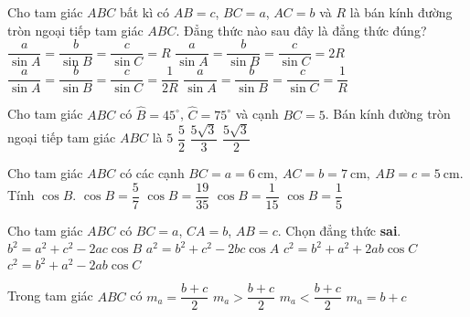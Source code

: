 \begin{ex}
	Cho tam giác $ABC$ bất kì có $AB=c$, $BC=a$, $AC=b$ và $R$ là bán kính đường tròn ngoại tiếp tam giác $ABC$. Đẳng thức nào sau đây là đẳng thức đúng?
	\choice
	{$\dfrac{a}{\sin A}=\dfrac{b}{\sin B}=\dfrac{c}{\sin C}=R$}
	{\True $\dfrac{a}{\sin A}=\dfrac{b}{\sin B}=\dfrac{c}{\sin C}=2R$}
	{$\dfrac{a}{\sin A}=\dfrac{b}{\sin B}=\dfrac{c}{\sin C}=\dfrac{1}{2R}$}
	{$\dfrac{a}{\sin A}=\dfrac{b}{\sin B}=\dfrac{c}{\sin C}=\dfrac{1}{R}$}
\end{ex}
\begin{ex}
	Cho tam giác $ABC$ có $\widehat{B}=45^\circ$, $\widehat{C}=75^\circ$ và cạnh $BC=5$. Bán kính đường tròn ngoại tiếp tam giác $ABC$ là
	\choice
	{$5$}
	{$\dfrac{5}{2}$}
	{\True $\dfrac{5 \sqrt{3}}{3}$}
	{$\dfrac{5 \sqrt{3}}{2}$}
\end{ex}
\begin{ex}
	Cho tam giác $ABC$ có các cạnh $BC=a=6\ \mathrm{cm},\ AC=b=7\ \mathrm{cm},\ AB=c=5\ \mathrm{cm}$. Tính $\cos B$.
	\choice
	{$\cos B=\dfrac{5}{7}$}
	{$\cos B=\dfrac{19}{35}$}
	{$\cos B=\dfrac{1}{15}$}
	{\True $\cos B=\dfrac{1}{5}$}
\end{ex}
\begin{ex}
	Cho tam giác $ABC$ có $BC=a$, $CA=b$, $AB=c$. Chọn đẳng thức \textbf{sai}.
	\choice
	{$b^2=a^2+c^2-2ac\cos B$}
	{$a^2=b^2+c^2-2bc\cos A$}
	{\True $c^2=b^2+a^2+2ab\cos C$}
	{$c^2=b^2+a^2-2ab\cos C$}
\end{ex}
\begin{ex}
	Trong tam giác $ABC$ có
	\choice
	{$m_a=\dfrac{b+c}{2}$}
	{$m_a>\dfrac{b+c}{2}$}
	{\True $m_a<\dfrac{b+c}{2}$}
	{$m_a=b+c$}
\end{ex}
